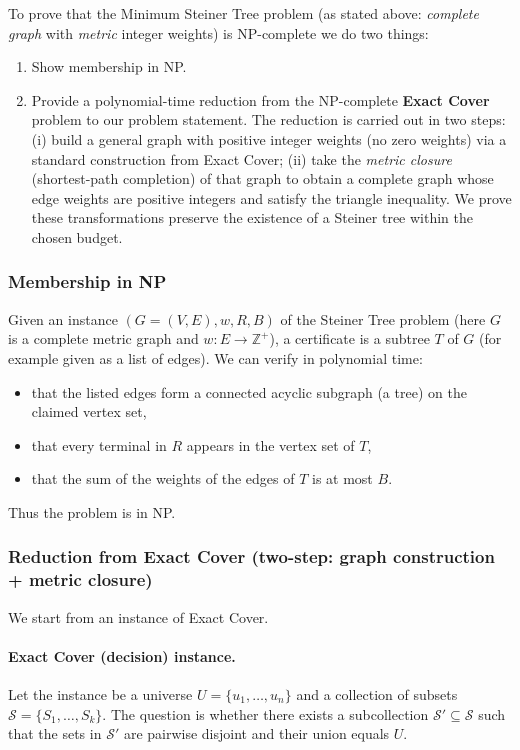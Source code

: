 \documentclass{article}
\begin{document}
To prove that the Minimum Steiner Tree problem (as stated above: \emph{complete graph} with \emph{metric} integer weights) is NP-complete we do two things:
\begin{enumerate}
    \item Show membership in NP.
    \item Provide a polynomial-time reduction from the NP-complete \textbf{Exact Cover} problem to our problem statement. The reduction is carried out in two steps: (i) build a general graph with positive integer weights (no zero weights) via a standard construction from Exact Cover; (ii) take the \emph{metric closure} (shortest-path completion) of that graph to obtain a complete graph whose edge weights are positive integers and satisfy the triangle inequality. We prove these transformations preserve the existence of a Steiner tree within the chosen budget.
\end{enumerate}

\subsubsection{Membership in NP}
Given an instance $(G=(V,E),w,R,B)$ of the Steiner Tree problem (here $G$ is a complete metric graph and $w:E\to\mathbb Z^+$), a certificate is a subtree $T$ of $G$ (for example given as a list of edges). We can verify in polynomial time:
\begin{itemize}
    \item that the listed edges form a connected acyclic subgraph (a tree) on the claimed vertex set,
    \item that every terminal in $R$ appears in the vertex set of $T$,
    \item that the sum of the weights of the edges of $T$ is at most $B$.
\end{itemize}
Thus the problem is in NP.

\subsubsection{Reduction from Exact Cover (two-step: graph construction + metric closure)}
We start from an instance of Exact Cover.

\paragraph{Exact Cover (decision) instance.}
Let the instance be a universe $U=\{u_1,\dots,u_n\}$ and a collection of subsets $\mathcal S=\{S_1,\dots,S_k\}$. The question is whether there exists a subcollection $\mathcal S'\subseteq\mathcal S$ such that the sets in $\mathcal S'$ are pairwise disjoint and their union equals $U$.
\end{document}
